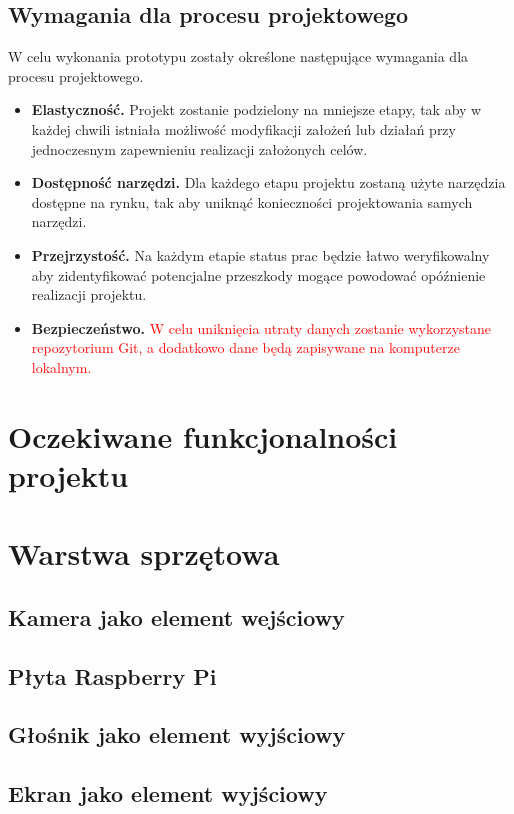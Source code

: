\documentclass[a4paper,12pt,reqno]{article}
\begin{document}
\subsection{Wymagania dla procesu projektowego}
W celu wykonania prototypu zostały określone następujące wymagania dla procesu projektowego.
\begin{itemize}
	\item \textbf{Elastyczność.} Projekt zostanie podzielony na mniejsze etapy, tak aby w każdej chwili istniała możliwość modyfikacji założeń lub działań przy jednoczesnym zapewnieniu realizacji założonych celów.
	\item \textbf{Dostępność narzędzi.} Dla każdego etapu projektu zostaną użyte narzędzia dostępne na rynku, tak aby uniknąć konieczności projektowania samych narzędzi.
	\item \textbf{Przejrzystość.} Na każdym etapie status prac będzie łatwo weryfikowalny aby zidentyfikować potencjalne przeszkody mogące powodować opóźnienie realizacji projektu.
	\item \textbf{Bezpieczeństwo.} \textcolor{red}{W celu uniknięcia utraty danych zostanie wykorzystane repozytorium Git, a dodatkowo dane będą zapisywane na komputerze lokalnym.}
\end{itemize}

\newpage
\section{Oczekiwane funkcjonalności projektu}

\newpage
\section{Warstwa sprzętowa}
\subsection{Kamera jako element wejściowy}
\subsection{Płyta Raspberry Pi}
\subsection{Głośnik jako element wyjściowy}
\subsection{Ekran jako element wyjściowy}
\end{document}
